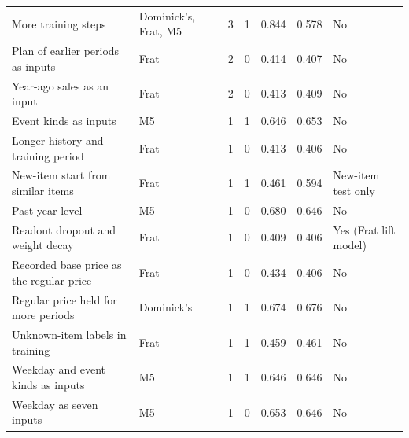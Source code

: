 \begin{table}[t]
\begin{tabular}{p{}p{}rrrrl}
More training steps & Dominick's, Frat, M5 & 3 & 1 & 0.844 & 0.578 & No \\
Plan of earlier periods as inputs & Frat & 2 & 0 & 0.414 & 0.407 & No \\
Year-ago sales as an input & Frat & 2 & 0 & 0.413 & 0.409 & No \\
Event kinds as inputs & M5 & 1 & 1 & 0.646 & 0.653 & No \\
Longer history and training period & Frat & 1 & 0 & 0.413 & 0.406 & No \\
New-item start from similar items & Frat & 1 & 1 & 0.461 & 0.594 & New-item test only \\
Past-year level & M5 & 1 & 0 & 0.680 & 0.646 & No \\
Readout dropout and weight decay & Frat & 1 & 0 & 0.409 & 0.406 & Yes (Frat lift model) \\
Recorded base price as the regular price & Frat & 1 & 0 & 0.434 & 0.406 & No \\
Regular price held for more periods & Dominick's & 1 & 1 & 0.674 & 0.676 & No \\
Unknown-item labels in training & Frat & 1 & 1 & 0.459 & 0.461 & No \\
Weekday and event kinds as inputs & M5 & 1 & 1 & 0.646 & 0.646 & No \\
Weekday as seven inputs & M5 & 1 & 0 & 0.653 & 0.646 & No \\
\bottomrule
\end{tabular}
\end{table}
